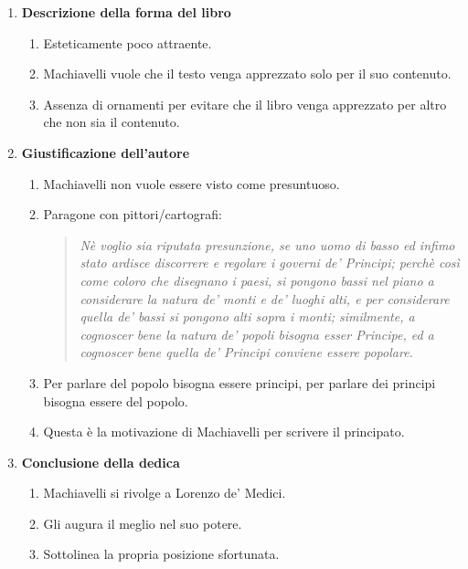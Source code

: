 \documentclass{article}
\begin{document}
\begin{enumerate}
    \item \textbf{Descrizione della forma del libro}
    \begin{enumerate}[label*=\arabic*.]
        \item Esteticamente poco attraente.
        \item Machiavelli vuole che il testo venga apprezzato solo per il suo contenuto.
        \item Assenza di ornamenti per evitare che il libro venga apprezzato per altro che non sia il contenuto.
    \end{enumerate}

    \item \textbf{Giustificazione dell'autore}
    \begin{enumerate}[label*=\arabic*.]
        \item Machiavelli non vuole essere visto come presuntuoso.
        \item Paragone con pittori/cartografi:
        \begin{quote}
            \itshape
            Nè voglio sia riputata presunzione, se uno uomo di basso ed infimo stato ardisce discorrere e regolare i governi de' Principi; perchè così come coloro che disegnano i paesi, si pongono bassi nel piano a considerare la natura de' monti e de' luoghi alti, e per considerare quella de' bassi si pongono alti sopra i monti; similmente, a cognoscer bene la natura de' popoli bisogna esser Principe, ed a cognoscer bene quella de' Principi conviene essere popolare.
        \end{quote}
        \item Per parlare del popolo bisogna essere principi, per parlare dei principi bisogna essere del popolo.
        \item Questa è la motivazione di Machiavelli per scrivere il principato.
    \end{enumerate}

    \item \textbf{Conclusione della dedica}
    \begin{enumerate}[label*=\arabic*.]
        \item Machiavelli si rivolge a Lorenzo de' Medici.
        \item Gli augura il meglio nel suo potere.
        \item Sottolinea la propria posizione sfortunata.
    \end{enumerate}
\end{enumerate}
\end{document}
